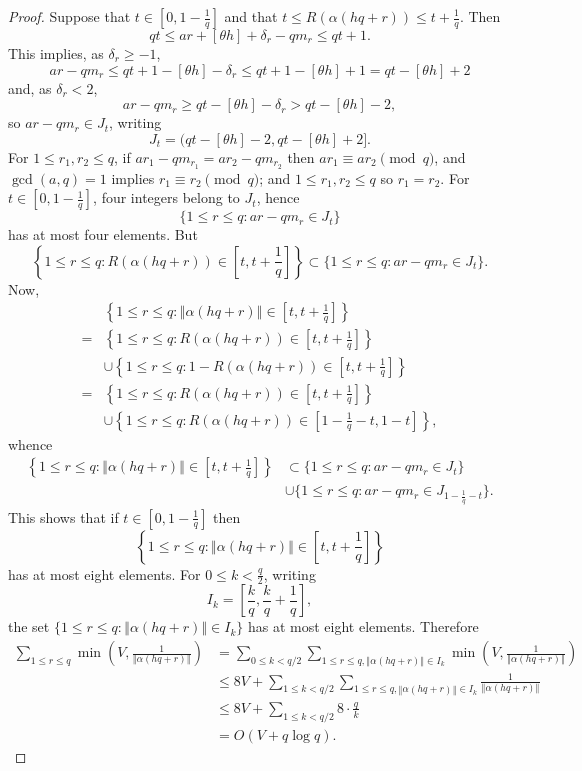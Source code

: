 \documentclass{article}
\newcommand{\norm}[1]{\left\Vert #1 \right\Vert}
\begin{document}
\begin{proof}
Suppose that $t \in \left[0, 1-\frac{1}{q}\right]$ and that $t \leq R(\alpha(hq+r)) \leq t+\frac{1}{q}$.
Then
\[
qt \leq ar+[\theta h]+\delta_r - qm_r \leq qt+1.
\]
This implies, as $\delta_r \geq -1$,
\[
ar-qm_r \leq qt+1 - [\theta h] - \delta_r \leq qt+1 -[\theta h] + 1 = qt-[\theta h]+2
\]
and, as $\delta_r < 2$,
\[
ar-qm_r \geq qt - [\theta h]-\delta_r > qt - [\theta h] - 2,
\]
so $ar-qm_r  \in J_t$, writing
\[
J_t=(qt-[\theta h]-2,qt-[\theta h]+2].
\] 
For $1 \leq r_1,r_2 \leq  q$, if $ar_1-qm_{r_1} = ar_2-qm_{r_2}$ then $ar_1 \equiv ar_2 \pmod{q}$, and 
$\gcd(a,q)=1$ implies $r_1 \equiv r_2 \pmod{q}$; and $1 \leq r_1,r_2 \leq q$ so
$r_1=r_2$. 
For
$t \in \left[0, 1-\frac{1}{q}\right]$,
four integers belong to $J_t$, hence
\[
\{1 \leq r \leq q: ar-qm_r \in J_t\}
\]
has at most four elements. But 
\[
\left\{1 \leq r \leq q: R(\alpha(hq+r)) \in \left[t,t+\frac{1}{q}\right]\right\}
\subset \{1 \leq r \leq q: ar-qm_r \in J_t\}.
\]
Now,
\[
\begin{split}
&\left\{1 \leq r \leq q: \norm{\alpha(hq+r)} \in \left[t,t+\frac{1}{q}\right]\right\}\\
=&\left\{1 \leq r \leq q: R(\alpha(hq+r)) \in \left[t,t+\frac{1}{q}\right]\right\}\\
&\cup \left\{1 \leq r \leq q: 1-R(\alpha(hq+r)) \in \left[t,t+\frac{1}{q}\right]\right\}\\
=&\left\{1 \leq r \leq q: R(\alpha(hq+r)) \in \left[t,t+\frac{1}{q}\right]\right\}\\
&\cup \left\{1 \leq r \leq q: R(\alpha(hq+r)) \in \left[1-\frac{1}{q}-t,1-t\right]\right\},
\end{split}
\]
whence
\begin{align*}
\left\{1 \leq r \leq q: \norm{\alpha(hq+r)} \in \left[t,t+\frac{1}{q}\right]\right\} &\subset 
\{1 \leq r \leq q: ar-qm_r \in J_t\}\\
&\cup \{1 \leq r \leq q: ar-qm_r \in J_{1-\frac{1}{q}-t}\}.
\end{align*}
This shows that if $t \in \left[0,1-\frac{1}{q}\right]$ then
\[
\left\{1 \leq r \leq q: \norm{\alpha(hq+r)} \in \left[t,t+\frac{1}{q}\right]\right\}
\]  
has at most eight elements. For   $0 \leq k < \frac{q}{2}$, writing
\[
I_k = \left[\frac{k}{q},\frac{k}{q}+\frac{1}{q}\right],
\] 
the set $\{1 \leq r \leq q: \norm{\alpha(hq+r)} \in I_k\}$ has at most eight elements. Therefore
\begin{align*}
\sum_{1 \leq r \leq q} \min\left(V,\frac{1}{\norm{\alpha(hq+r)}}\right)&=
\sum_{0 \leq k < q/2} \sum_{1 \leq r \leq q, \norm{\alpha(hq+r)} \in I_k} \min\left(V,\frac{1}{\norm{\alpha(hq+r)}}\right)\\
&\leq 8V + \sum_{1 \leq k < q/2} \sum_{1 \leq r \leq q, \norm{\alpha(hq+r)} \in I_k} \frac{1}{\norm{\alpha(hq+r)}}\\
&\leq 8V + \sum_{1 \leq k < q/2}  8 \cdot \frac{q}{k}\\
&=O(V+q \log q).
\end{align*}
\end{proof}
\end{document}
